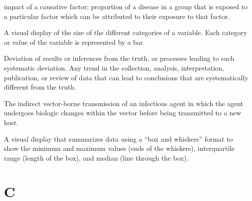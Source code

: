 \documentclass[11pt]{article}
\begin{document}
\begin{description}
impact of a causative factor; proportion of a disease in a group
that is exposed to a particular factor which can be attributed to
their exposure to that factor.
\item[Bar chart] A visual display of the size of the different
categories of a variable. Each category or value of the variable
is represented by a bar.
\item[Bias] Deviation of results or inferences from the truth, or
processes leading to such systematic deviation. Any trend in the
collection, analysis, interpretation, publication, or review of
data that can lead to conclusions that are systematically
different from the truth.
\item[Biologic transmission] The indirect vector-borne
transmission of an infectious agent in which the agent undergoes
biologic changes within the vector before being transmitted to a
new host.
\item[Box plot] A visual display that summarizes data using a
``box and whiskers'' format to show the minimum and maximum
values (ends of the whiskers), interquartile range (length of
the box), and median (line through the box).
\end{description}

\section*{C}
\end{document}
